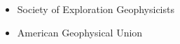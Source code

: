 

\begin{cvparagraph}

    \fontsize{11pt}{1.3em}\selectfont
    \begin{itemize}[leftmargin=2.5ex]
        \item {Society of Exploration Geophysicists}
        \item {American Geophysical Union}
    \end{itemize}


\end{cvparagraph}
